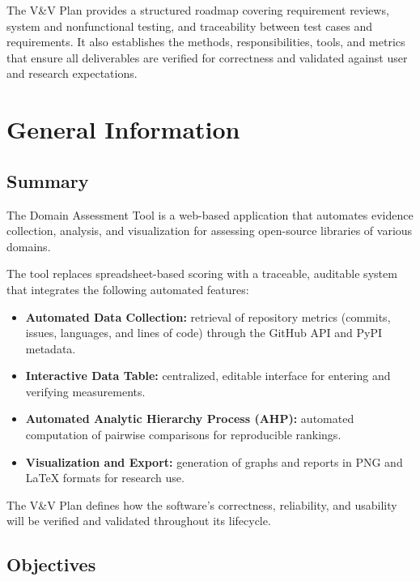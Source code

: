 \documentclass[12pt, titlepage]{article}
\begin{document}
The V\&V Plan provides a structured roadmap covering requirement reviews,
system and nonfunctional testing, and traceability between test cases and
requirements. It also establishes the methods, responsibilities, tools, and
metrics that ensure all deliverables are verified for correctness and validated
against user and research expectations.

\section{General Information}
\label{sec:general-info}
\subsection{Summary}
\label{subsec:summary}
The Domain Assessment Tool is a web-based application
that automates evidence collection, analysis, and visualization for assessing
open-source libraries of various domains.

The tool replaces spreadsheet-based scoring with a traceable, auditable system
that integrates the following automated features:

\begin{itemize}
  \item \textbf{Automated Data Collection:} retrieval of repository metrics
  (commits, issues, languages, and lines of code) through the GitHub API and
  PyPI metadata.

  \item \textbf{Interactive Data Table:} centralized, editable interface for
  entering and verifying measurements.

  \item \textbf{Automated Analytic Hierarchy Process (AHP):} automated
  computation of pairwise comparisons for reproducible rankings.

  \item \textbf{Visualization and Export:} generation of graphs and reports in
  PNG and \LaTeX{} formats for research use.
\end{itemize}

The V\&V Plan defines how the software’s correctness, reliability, and usability
will be verified and validated throughout its lifecycle.

\subsection{Objectives}
\label{subsec:objectives}
\end{document}
